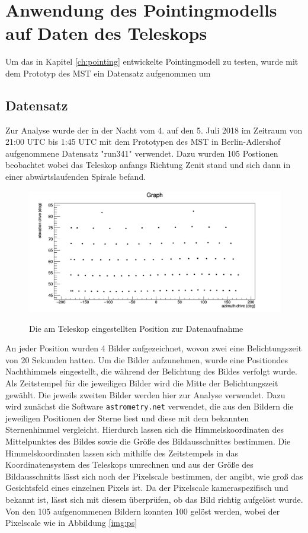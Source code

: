 \chapter{Anwendung des Pointingmodells auf Daten des Teleskops}
\label{ch:auswertung}
Um das in Kapitel \ref{ch:pointing} entwickelte Pointingmodell zu testen, wurde mit dem Prototyp des MST ein Datensatz aufgenommen um
\section{Datensatz}
Zur Analyse wurde der in der Nacht vom 4. auf den 5. Juli 2018 im Zeitraum von 21:00 UTC bis 1:45 UTC mit dem Prototypen des MST in Berlin-Adlershof aufgenommene Datensatz "run341" verwendet. Dazu wurden 105 Postionen beobachtet wobei das Teleskop anfangs Richtung Zenit stand und sich dann in einer abwärtslaufenden Spirale befand.
\begin{figure}[htbp]
\centering
\includegraphics[width=\textwidth]{../341/data4.png}
\label{img:record}
\caption{Die am Teleskop eingestellten Position zur Datenaufnahme}
\end{figure}
An jeder Position wurden 4 Bilder aufgezeichnet, wovon zwei eine Belichtungszeit von 20 Sekunden hatten.
Um die Bilder aufzunehmen, wurde eine Positiondes Nachthimmels eingestellt, die während der Belichtung des Bildes verfolgt wurde. Als Zeitstempel für die jeweiligen Bilder wird die Mitte der Belichtungszeit gewählt. Die jeweils zweiten Bilder werden hier zur Analyse verwendet. Dazu wird zunächst die Software \texttt{astrometry.net} verwendet, die aus den Bildern die jeweiligen Positionen der Sterne liest und diese mit dem bekannten Sternenhimmel vergleicht. Hierdurch lassen sich die Himmelskoordinaten des Mittelpunktes des Bildes sowie die Größe des Bildausschnittes bestimmen.
Die Himmelskoordinaten lassen sich mithilfe des Zeitstempels in das Koordinatensystem des Teleskops umrechnen und aus der Größe des Bildausschnitts lässt sich noch der Pixelscale bestimmen, der angibt, wie groß das Gesichtsfeld eines einzelnen Pixels ist. Da der Pixelscale kameraspezifisch und bekannt ist, lässt sich mit diesem überprüfen, ob das Bild richtig aufgelöst wurde. Von den 105 aufgenommenen Bildern konnten 100 gelöst werden, wobei der Pixelscale wie in Abbildung \ref{img:ps}
